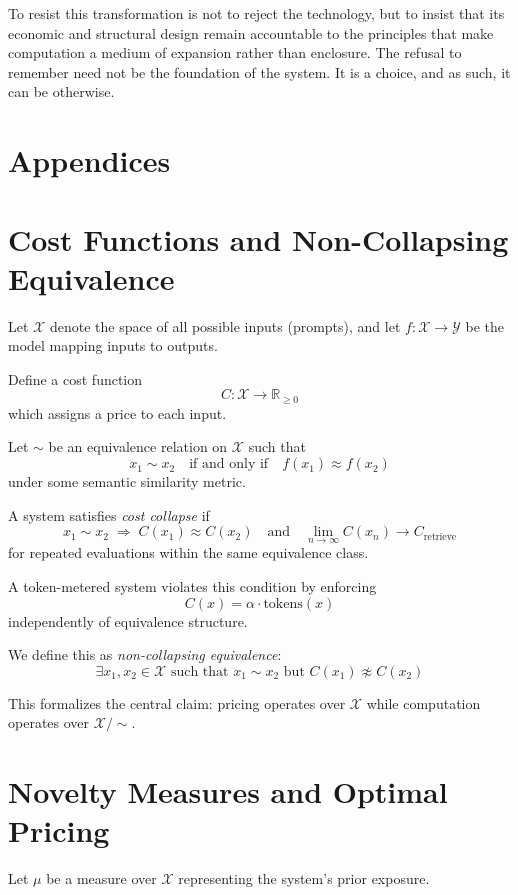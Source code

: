 \documentclass[12pt, oneside]{article}
\begin{document}
To resist this transformation is not to reject the technology, but to insist that its economic and structural design remain accountable to the principles that make computation a medium of expansion rather than enclosure. The refusal to remember need not be the foundation of the system. It is a choice, and as such, it can be otherwise.

\newpage
\section*{Appendices}

\appendix

\section{Cost Functions and Non-Collapsing Equivalence}

Let $\mathcal{X}$ denote the space of all possible inputs (prompts), and let 
$f : \mathcal{X} \to \mathcal{Y}$ be the model mapping inputs to outputs.

Define a cost function
\[
C : \mathcal{X} \to \mathbb{R}_{\geq 0}
\]
which assigns a price to each input.

Let $\sim$ be an equivalence relation on $\mathcal{X}$ such that
\[
x_1 \sim x_2 \quad \text{if and only if} \quad f(x_1) \approx f(x_2)
\]
under some semantic similarity metric.

A system satisfies \emph{cost collapse} if
\[
x_1 \sim x_2 \;\Rightarrow\; C(x_1) \approx C(x_2) \quad \text{and} \quad \lim_{n \to \infty} C(x_n) \to C_{\text{retrieve}}
\]
for repeated evaluations within the same equivalence class.

A token-metered system violates this condition by enforcing
\[
C(x) = \alpha \cdot \text{tokens}(x)
\]
independently of equivalence structure.

We define this as \emph{non-collapsing equivalence}:
\[
\exists x_1, x_2 \in \mathcal{X} \text{ such that } x_1 \sim x_2 \text{ but } C(x_1) \not\approx C(x_2)
\]

This formalizes the central claim: pricing operates over $\mathcal{X}$ while computation operates over $\mathcal{X}/\sim$.

\section{Novelty Measures and Optimal Pricing}

Let $\mu$ be a measure over $\mathcal{X}$ representing the system's prior exposure.
\end{document}
